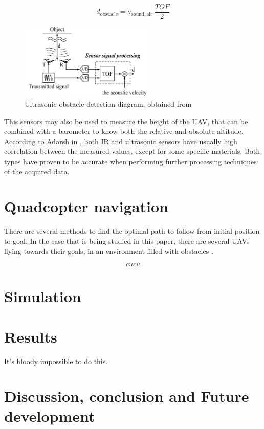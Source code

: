 \documentclass[journal]{IEEEtran}
\newcommand*{\subb}[1]{_{\mathrm{#1}}}
\begin{document}
		\begin{equation} \label{eq:ultrasonic_formula}
		d\subb{obstacle} = \text{v}\subb{sound, air} \ \frac{TOF}{2}
		\end{equation}
		\begin{figure}
			\centering
			\includegraphics[width=2.5in]{ultrasonic2}
			\caption{Ultrasonic obstacle detection diagram, obtained from \cite{hirata2008cross}}
			\label{fig:ultrasonic}
		\end{figure}
		
		This sensors may also be used to measure the height of the UAV, that can be combined with a barometer to know both the relative and absolute altitude. According to Adarsh in \cite{AdarshS2016PcoI}, both IR and ultrasonic sensors have usually high correlation between the measured values, except for some specific materials. Both types have proven to be accurate when performing further processing techniques of the acquired data.
		
	\section{Quadcopter navigation}
	There are several methods to find the optimal path to follow from initial position to goal. In the case that is being studied in this paper, there are several UAVs flying towards their goals, in an environment filled with obstacles \cite{potfieldsmethod}.
	
	\begin{equation} \label{eq:pot_}
	cucu
	\end{equation}
	
	\section{Simulation}
	
	
	\section{Results}
	It's bloody impossible to do this.
	
	\section{Discussion, conclusion and Future development}
	
\end{document}
